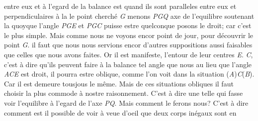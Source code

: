 entre eux et à l'egard de la balance est quand ils sont paralleles entre eux et perpendiculaires à la 
le point cherché \textit{G} menons \textit{PGQ} axe de l'equilibre soutenant la
quoyque l'angle \textit{PGE} et \textit{PGC} puisse estre quelconque posons le droit; car c'est le plus simple. Mais comme nous ne voyons encor point de jour, pour découvrir le point \textit{G}. il faut que nous nous servions encor d'autres suppositions aussi faisables que celles que nous avons faites. Or il est manifeste, 
l'entour de leur centres \textit{E}. \textit{C}, c'est à dire qu'ils peuvent faire à la balance tel angle que nous 
au lieu que l'angle \textit{ACE} est droit, il pourra estre oblique, comme l'on voit dans la situation (\textit{A})\textit{C}(\textit{B}). Car il est 
demeure tousjous le même. Mais de ces situations obliques il faut choisir la plus commode à nostre raisonnement. C'est à dire une telle qui fasse voir 
l'equilibre 
à l'egard de l'axe \textit{PQ}. Mais comment le ferons nous? C'est à dire comment est il possible de voir à veue d'oeil que deux corps inégaux sont en 
